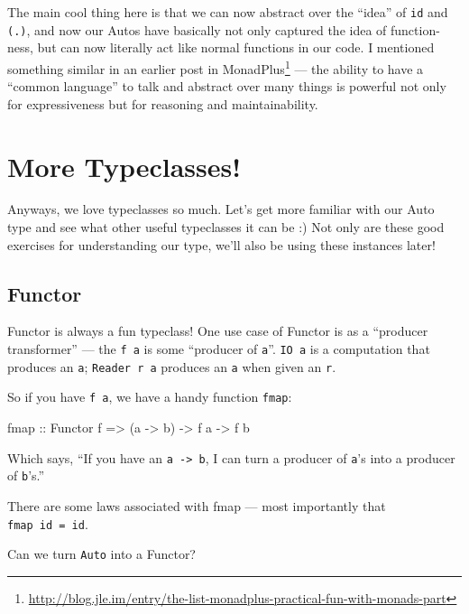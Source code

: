 \documentclass[]{article}
\newenvironment{Shaded}{}{}
\newcommand{\DataTypeTok}[1]{\textcolor[rgb]{0.56,0.13,0.00}{{#1}}}
\newcommand{\OtherTok}[1]{\textcolor[rgb]{0.00,0.44,0.13}{{#1}}}
\newcommand{\NormalTok}[1]{{#1}}
\renewcommand{\href}[2]{#2\footnote{\url{#1}}}
\begin{document}
The main cool thing here is that we can now abstract over the ``idea'' of
\texttt{id} and \texttt{(.)}, and now our Autos have basically not only captured
the idea of function-ness, but can now literally act like normal functions in
our code. I mentioned something similar in an earlier post
\href{http://blog.jle.im/entry/the-list-monadplus-practical-fun-with-monads-part}{in
MonadPlus} --- the ability to have a ``common language'' to talk and abstract
over many things is powerful not only for expressiveness but for reasoning and
maintainability.

\section{More Typeclasses!}\label{more-typeclasses}

Anyways, we love typeclasses so much. Let's get more familiar with our Auto type
and see what other useful typeclasses it can be :) Not only are these good
exercises for understanding our type, we'll also be using these instances later!

\subsection{Functor}\label{functor}

Functor is always a fun typeclass! One use case of Functor is as a ``producer
transformer'' --- the \texttt{f\ a} is some ``producer of \texttt{a}''.
\texttt{IO\ a} is a computation that produces an \texttt{a};
\texttt{Reader\ r\ a} produces an \texttt{a} when given an \texttt{r}.

So if you have \texttt{f\ a}, we have a handy function \texttt{fmap}:

\begin{Shaded}
\begin{Highlighting}[]
\NormalTok{fmap}\OtherTok{ ::} \DataTypeTok{Functor} \NormalTok{f }\OtherTok{=>} \NormalTok{(a }\OtherTok{->} \NormalTok{b) }\OtherTok{->} \NormalTok{f a }\OtherTok{->} \NormalTok{f b}
\end{Highlighting}
\end{Shaded}

Which says, ``If you have an \texttt{a\ -\textgreater{}\ b}, I can turn a
producer of \texttt{a}'s into a producer of \texttt{b}'s.''

There are some laws associated with fmap --- most importantly that
\texttt{fmap\ id\ =\ id}.

Can we turn \texttt{Auto} into a Functor?
\end{document}
